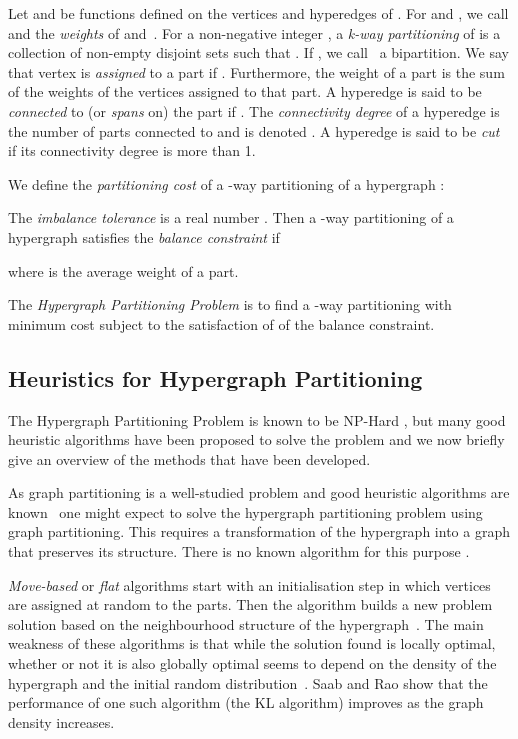 \documentclass[twocolumn]{svjour3}          \smartqed
\begin{document}
Let  and  be functions defined on the vertices and hyperedges of .  For  and , we call  and  the \textit{weights} of  and~.   For a non-negative integer , a \textit{k-way partitioning} of  is a collection of non-empty disjoint sets   such that .   If , we call~ a bipartition.  We say that vertex  is \emph{assigned} to a part  if . Furthermore, the weight of a part  is the sum of the weights of the vertices assigned to that part. A hyperedge  is said to be \textit{connected} to (or \textit{spans} on) the part  if . The \textit{connectivity degree} of a hyperedge  is the number of parts connected to  and is denoted . A hyperedge is said to be \textit{cut} if its connectivity degree is more than 1.

We define the \textit{partitioning cost} of a -way partitioning  of a hypergraph :



The \emph{imbalance tolerance} is a real number .   Then a -way partitioning  of a hypergraph  satisfies the \textit{balance constraint} if


where  is the average weight of a part.

The \textit{Hypergraph Partitioning Problem} is to find a -way partitioning with minimum cost subject to the satisfaction of of the balance constraint.


\subsection{Heuristics for Hypergraph Partitioning}\label{sec:relatedwork}

The Hypergraph Partitioning Problem is known to be NP-Hard \cite{garey1979computers}, but many good heuristic algorithms have been proposed to solve the problem \cite{ccatalyurek2011patoh,devetal2006,fm1982,karypis1999kway} and we now briefly give an overview of the methods that have been developed.

As graph partitioning is a well-studied problem and good heuristic algorithms are known~\cite{fjall1998graphsurvey} one might expect to solve the hypergraph partitioning problem using graph partitioning. This requires a transformation of the hypergraph into a graph that preserves its structure. There is no known algorithm for this purpose \cite{ihler1993}.

\textit{Move-based} or \textit{flat} algorithms start with an initialisation step in which vertices are assigned at random to the parts. Then the algorithm builds a new problem solution based on the neighbourhood structure of the hypergraph~\cite{fm1982,san1989kfm}. The main weakness of these algorithms is that while the solution found is locally optimal, whether or not it is also globally optimal seems to depend on the density of the hypergraph and the initial random distribution~\cite{goldberg1983}. Saab and Rao \cite{saab1992rao} show that the performance of one such algorithm (the KL algorithm) improves as the graph density increases.
\end{document}
